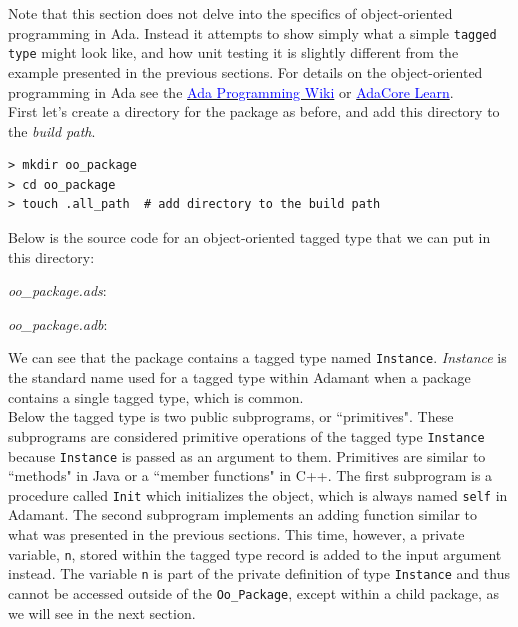 Note that this section does not delve into the specifics of object-oriented programming in Ada. Instead it attempts to show simply what a simple \texttt{tagged type} might look like, and how unit testing it is slightly different from the example presented in the previous sections. For details on the object-oriented programming in Ada see the \href{https://en.wikibooks.org/wiki/Ada_Programming/Object_Orientation}{\textcolor{blue}{Ada Programming Wiki}} or \href{https://learn.adacore.com/courses/intro-to-ada/chapters/object_oriented_programming.html}{\textcolor{blue}{AdaCore Learn}}. \\

First let's create a directory for the package as before, and add this directory to the \textit{build path}.

\vspace{5mm} %
\begin{verbatim}
> mkdir oo_package 
> cd oo_package 
> touch .all_path  # add directory to the build path
\end{verbatim}
\vspace{5mm} %

Below is the source code for an object-oriented tagged type that we can put in this directory:

\textit{oo\_package.ads}:


\textit{oo\_package.adb}:


We can see that the package contains a tagged type named \texttt{Instance}. \textit{Instance} is the standard name used for a tagged type within Adamant when a package contains a single tagged type, which is common. \\

Below the tagged type is two public subprograms, or ``primitives". These subprograms are considered primitive operations of the tagged type \texttt{Instance} because \texttt{Instance} is passed as an argument to them. Primitives are similar to ``methods" in Java or a ``member functions" in C++. The first subprogram is a procedure called \texttt{Init} which initializes the object, which is always named \texttt{self} in Adamant. The second subprogram implements an adding function similar to what was presented in the previous sections. This time, however, a private variable, \texttt{n}, stored within the tagged type record is added to the input argument instead. The variable \texttt{n} is part of the private definition of type \texttt{Instance} and thus cannot be accessed outside of the \texttt{Oo\_Package}, except within a child package, as we will see in the next section.

